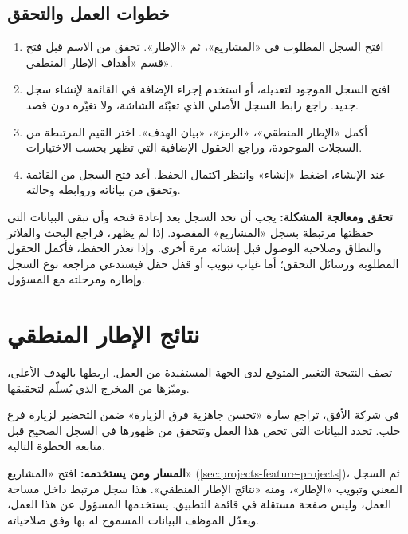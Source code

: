 \subsection{خطوات العمل والتحقق}
\begin{enumerate}
\item افتح السجل المطلوب في «المشاريع»، ثم «الإطار». تحقق من الاسم قبل فتح قسم «أهداف الإطار المنطقي».
\item افتح السجل الموجود لتعديله، أو استخدم إجراء الإضافة في القائمة لإنشاء سجل جديد. راجع رابط السجل الأصلي الذي تعبّئه الشاشة، ولا تغيّره دون قصد.
\item أكمل «الإطار المنطقي»، «الرمز»، «بيان الهدف». اختر القيم المرتبطة من السجلات الموجودة، وراجع الحقول الإضافية التي تظهر بحسب الاختيارات.
\item عند الإنشاء، اضغط «إنشاء» وانتظر اكتمال الحفظ. أعد فتح السجل من القائمة وتحقق من بياناته وروابطه وحالته.
\end{enumerate}

\textbf{تحقق ومعالجة المشكلة:} يجب أن تجد السجل بعد إعادة فتحه وأن تبقى البيانات التي حفظتها مرتبطة بسجل «المشاريع» المقصود. إذا لم يظهر، فراجع البحث والفلاتر والنطاق وصلاحية الوصول قبل إنشائه مرة أخرى. وإذا تعذر الحفظ، فأكمل الحقول المطلوبة ورسائل التحقق؛ أما غياب تبويب أو قفل حقل فيستدعي مراجعة نوع السجل وإطاره ومرحلته مع المسؤول.

\clearpage
\section{نتائج الإطار المنطقي}
\label{sec:projects-feature-logframe-outcomes}

تصف النتيجة التغيير المتوقع لدى الجهة المستفيدة من العمل. اربطها بالهدف الأعلى، وميّزها من المخرج الذي يُسلّم لتحقيقها.

\begin{rcnote}
في شركة الأفق، تراجع سارة «تحسن جاهزية فرق الزيارة» ضمن التحضير لزيارة فرع حلب. تحدد البيانات التي تخص هذا العمل وتتحقق من ظهورها في السجل الصحيح قبل متابعة الخطوة التالية.
\end{rcnote}

\textbf{المسار ومن يستخدمه:} افتح «المشاريع» (\ref{sec:projects-feature-projects})، ثم السجل المعني وتبويب «الإطار»، ومنه «نتائج الإطار المنطقي». هذا سجل مرتبط داخل مساحة العمل، وليس صفحة مستقلة في قائمة التطبيق. يستخدمها المسؤول عن هذا العمل، ويعدّل الموظف البيانات المسموح له بها وفق صلاحياته.

